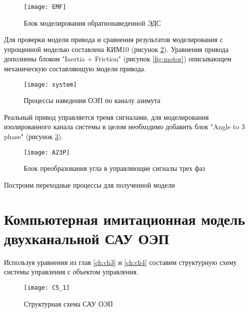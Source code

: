 \begin{figure}[ht]
	\centering
	\texttt{[image: EMF]} 
	\caption{Блок моделирования обратнонаведенной ЭДС}
	\label{fig:EMF}
\end{figure}










Для проверки модели привода и сравнения результатов моделирования с упрощенной моделью составлена КИМ10 (рисунок \ref{fig:KIM10}). Уравнения привода дополнены блоком "Inertia + Friction" (рисунок \ref{fig:motor}) описывающем механическую составляющую модели привода.
 
\begin{figure}[ht]
 	\centering
 	\texttt{[image: system]} 
 	\caption{Процессы наведения ОЭП по каналу азимута}
 	\label{fig:KIM10}
\end{figure}

Реальный привод управляется тремя сигналами, для моделирования изолированного канала системы в целом необходимо добавить блок "Angle to 3 phase" (рисунок \ref{fig:a2p}).

\begin{figure}[ht]
	\centering
	\texttt{[image: A23P]} 
	\caption{Блок преобразования угла в управляющие сигналы трех фаз}
	\label{fig:a2p}
\end{figure}

Построим переходные процессы для полученной модели
















\section{Компьютерная имитационная модель двухканальной САУ ОЭП  } \label{ch:ch5/sect2}

Используя  уравнения из глав \ref{ch:ch3} и \ref{ch:ch4} составим структурную схему системы управления с объектом управления.
 
\begin{figure}[ht]
	\centering
	\texttt{[image: C5\_1]} 
	\caption{Структурная схема САУ ОЭП}
	\label{fig:structure}
\end{figure}

